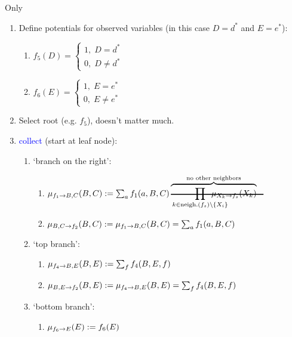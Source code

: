 \begin{frame}{Only}
\begingroup
\footnotesize
\begin{enumerate}
 \item<only@1> Define potentials for observed variables (in this case $D=d^*$ and $E=e^*$):
 \begin{enumerate}
 \item $f_5(D) = 
						\left\{\begin{array}{c} 
							1, \; D=d^* \\[-1mm]
							0, \; D \neq d^* 
						\end{array}\right.$
 \item $f_6(E) = 
						\left\{\begin{array}{c} 
							1, \; E=e^* \\[-1mm]
							0, \; E \neq e^*
						\end{array}\right.$
 \end{enumerate}
 \item<only@1> Select root (e.g. $f_{5}$), doesn't matter much. 
 \item<only@1-5> \textcolor{blue}{collect} (start at leaf node): 
 \begin{enumerate}
  \item<only@2> `branch on the right':
  \begin{enumerate}
  \item $\msg{f_{1}}{B,C}(B,C) := \sum_{a} f_{1}(a,B,C) \overbrace{\hcancel{\prod_{k \in \text{neigh.}(f_s)\setminus\{X_i\}}\kern-5ex 
			\mu_{X_k \to f_s}(X_k)}}^{\text{no other neighbors}}$
  \item $\mu_{B,C\rightarrow f_{2}}(B,C) := \mu_{f_{1}\rightarrow B,C}(B,C) = \sum_{a} f_{1}(a,B,C)$
  \end{enumerate}
  \item<only@3> `top branch':
  \begin{enumerate}
  \item $\mu_{f_{4}\rightarrow B,E}(B,E) := \sum_{f} f_{4}(B,E,f)$
  \item $\mu_{B,E\rightarrow f_{2}}(B,E) := \mu_{f_{4}\rightarrow B,E}(B,E) = \sum_{f} f_{4}(B,E,f)$
  \end{enumerate}
  \item<only@4> `bottom branch':
  \begin{enumerate}
  \item $\mu_{f_{6}\rightarrow E}(E) := f_{6}(E)$

\end{enumerate}
\end{enumerate}
\end{enumerate}
\end{frame}
